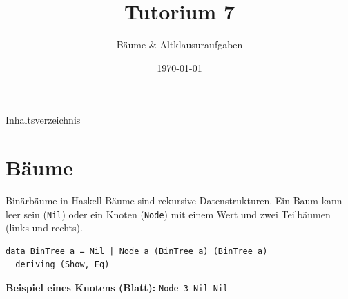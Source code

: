 \documentclass[aspectratio=169,11pt]{beamer}
\title{\textbf{Tutorium 7}}
\subtitle{Bäume \& Altklausuraufgaben}
\institute{Grundlagen der Praktischen Informatik}
\author{}
\date{\today}
\begin{document}
\begin{frame}[plain]
    \titlepage
\end{frame}

\begin{frame}{Inhaltsverzeichnis}
    \tableofcontents
\end{frame}

\section{Bäume}

\begin{frame}[fragile]{Binärbäume in Haskell}
    Bäume sind rekursive Datenstrukturen. Ein Baum kann leer sein (\texttt{Nil}) oder ein Knoten (\texttt{Node}) mit einem Wert und zwei Teilbäumen (links und rechts).
    
    \begin{tcolorbox}[modernbox, title=Definition eines Binärbaums]
\begin{lstlisting}
data BinTree a = Nil | Node a (BinTree a) (BinTree a)
  deriving (Show, Eq)
\end{lstlisting}
    \end{tcolorbox}
    \small
    \textbf{Beispiel eines Knotens (Blatt):} \texttt{Node 3 Nil Nil}

    \vspace{0.3cm}
    \begin{center}
    \end{center}

\end{frame}
\end{document}
